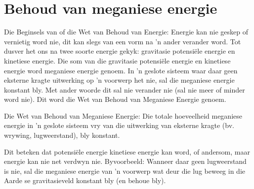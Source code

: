 \section{Behoud van meganiese energie }
            \nopagebreak
{} { Die Beginsels van of die Wet van Behoud van Energie: Energie kan nie geskep of vernietig word nie, dit kan slegs van een vorm na   'n ander verander word.  } 
        \label{m38786*id68483}Tot dusver het ons na twee soorte energie gekyk: gravitasie potensiële energie en kinetiese energie. Die som van die gravitasie potensiële energie en kinetiese energie word meganiese energie genoem. In   'n geslote sisteem waar daar geen eksterne kragte uitwerking op   'n voorwerp het nie, sal die meganiese energie konstant bly. Met ander woorde dit sal nie verander nie (sal nie meer of minder word nie). Dit word die Wet van Behoud van Meganiese Energie genoem. 

 { Die Wet van Behoud van Meganiese Energie:  Die totale hoeveelheid meganiese energie in   'n geslote sisteem vry van die uitwerking van eksterne kragte (bv. wrywing, lugweerstand), bly konstant.  } 

Dit beteken dat potensiële energie kinetiese energie kan word, of andersom, maar energie kan nie net verdwyn nie. Byvoorbeeld: Wanneer daar geen lugweerstand is nie, sal die meganiese energie van   'n voorwerp wat deur die lug beweeg in die Aarde se gravitasieveld konstant bly (en behoue bly).




